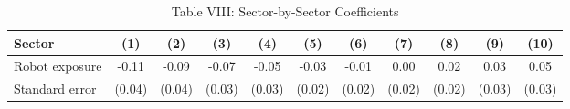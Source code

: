 \documentclass{article}
\begin{document}
\begin{table}
\small
\centering
\caption{Table VIII: Sector-by-Sector Coefficients}
\begin{tabular}{lcccccccccc}
\toprule
Sector & (1) & (2) & (3) & (4) & (5) & (6) & (7) & (8) & (9) & (10) \\
\midrule
Robot exposure & -0.11 & -0.09 & -0.07 & -0.05 & -0.03 & -0.01 & 0.00 & 0.02 & 0.03 & 0.05 \\
Standard error & (0.04) & (0.04) & (0.03) & (0.03) & (0.02) & (0.02) & (0.02) & (0.02) & (0.03) & (0.03) \\
\bottomrule
\end{tabular}
\end{table}
\end{document}
